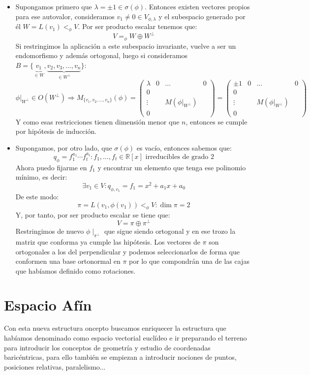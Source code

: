 \documentclass[10pt,a4paper,openright]{book}
\theoremstyle{break}
\begin{document}
\begin{itemize}
\item Supongamos primero que $\lambda = \pm 1 \in \sigma(\phi)$. Entonces existen vectores propios para ese autovalor, consideramos $v_1 \neq 0 \in V_{\phi, \lambda}$ y el subespacio generado por él $W = L(v_1) <_\phi V$. Por ser producto escalar tenemos que:
$$V =_\phi W \oplus W^\perp$$
Si restringimos la aplicación a este subespacio invariante, vuelve a ser un endomorfismo y además ortogonal, luego si consideramos $B=\{\underbrace{v_1}_{\in W}, \underbrace{v_2, v_3, \ldots, v_n}_{\in W^\perp}\}$:
$$\phi|_{W^\perp}\in O(W^\perp)\Rightarrow M_{\{v_1,v_2,\ldots , v_n\}} (\phi) =
\left(
\begin{array}{c|ccc}
\lambda & 0 & \ldots & 0 \\
\hline
0  & & &  \\
\vdots & & M(\phi|_{W^\perp}) & \\
0 & & &
\end{array}
\right) = \left(
\begin{array}{c|ccc}
\pm 1 & 0 & \ldots & 0 \\
\hline
0  & & &  \\
\vdots & & M(\phi|_{W^\perp}) & \\
0 & & &
\end{array}
\right) $$
Y como esas restricciones tienen dimensión menor que $n$, entonces se cumple  por hipótesis de inducción.

\item Supongamos, por otro lado, que $\sigma (\phi)$ es vacío, entonces sabemos que:
$$q_\phi = f_1^{a_1} \cdots f_t^{a_t}: f_1, \ldots, f_t \in \mathbb{R}[x] \mbox{ irreducibles de grado } 2$$
Ahora puedo fijarme en $f_{1}$ y encontrar un elemento que tenga ese polinomio mínimo, es decir:
$$\exists v_1\in V: q_{\phi, v_1} = f_1 = x^2+a_1x+a_0$$
De este modo:
$$\pi = L(v_1, \phi(v_1))<_\phi V: \dim \pi = 2$$
Y, por tanto, por ser producto escalar se tiene que:
$$V = \pi \oplus \pi^\perp$$
Restringimos de nuevo $\phi\mid_{\pi^\perp}$ que sigue siendo ortogonal y en ese trozo la matriz que conforma ya cumple las hipótesis. Los vectores de $\pi$ son ortogonales a los del perpendicular y podemos seleccionarlos de forma que conformen una base ortonormal en $\pi$ por lo que compondrán una de las cajas que habíamos definido como rotaciones.
\end{itemize}

\chapter{Espacio Afín}
Con esta nueva estructura oncepto buscamos enriquecer la estructura que habíamos denominado como espacio vectorial euclídeo e ir preparando el terreno para introducir los conceptos de geometría y estudio de coordenadas baricéntricas, para ello también se empiezan a introducir nociones de puntos, posiciones relativas, paralelismo...
\end{document}
